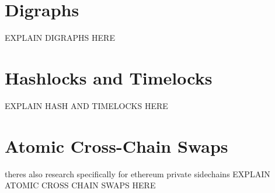 \clearpage
%
%
\section{Digraphs}
\label{sec:background:second_section}
EXPLAIN DIGRAPHS HERE
\cite{bang2007theory}

\section{Hashlocks and Timelocks}
\label{sec:background:third_section}
EXPLAIN HASH AND TIMELOCKS HERE


\section{Atomic Cross-Chain Swaps}
\label{sec:background:fifth_section}

theres also research specifically for ethereum private sidechains \cite{robinson2019atomic}
EXPLAIN ATOMIC CROSS CHAIN SWAPS HERE
\cite{herlihy2018atomic}